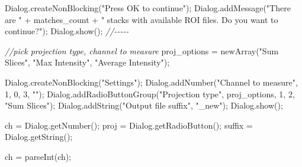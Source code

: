 \documentclass[
  12pt,
  a4paper,
]{book}
\newenvironment{Shaded}{}{}
\newcommand{\CommentTok}[1]{\textcolor[rgb]{0.38,0.63,0.69}{\textit{#1}}}
\newcommand{\DecValTok}[1]{\textcolor[rgb]{0.25,0.63,0.44}{#1}}
\newcommand{\NormalTok}[1]{#1}
\newcommand{\OperatorTok}[1]{\textcolor[rgb]{0.40,0.40,0.40}{#1}}
\newcommand{\StringTok}[1]{\textcolor[rgb]{0.25,0.44,0.63}{#1}}
\begin{document}
\begin{Shaded}
\begin{Highlighting}[]
\NormalTok{Dialog}\OperatorTok{.}\NormalTok{createNonBlocking}\OperatorTok{(}\StringTok{"Press OK to continue"}\OperatorTok{);}
\NormalTok{Dialog}\OperatorTok{.}\NormalTok{addMessage}\OperatorTok{(}\StringTok{"There are "} \OperatorTok{+}\NormalTok{ matches\_count }\OperatorTok{+} \StringTok{" stacks with available ROI files.  Do you want to continue?"}\OperatorTok{);}
\NormalTok{Dialog}\OperatorTok{.}\NormalTok{show}\OperatorTok{();}
\CommentTok{//{-}{-}{-}{-}{-}}

\CommentTok{//pick projection type, channel to measure}
\NormalTok{proj\_options }\OperatorTok{=}\NormalTok{ newArray}\OperatorTok{(}\StringTok{"Sum Slices"}\OperatorTok{,} \StringTok{"Max Intensity"}\OperatorTok{,} \StringTok{"Average Intensity"}\OperatorTok{);}

\NormalTok{Dialog}\OperatorTok{.}\NormalTok{createNonBlocking}\OperatorTok{(}\StringTok{"Settings"}\OperatorTok{);}
\NormalTok{Dialog}\OperatorTok{.}\NormalTok{addNumber}\OperatorTok{(}\StringTok{"Channel to measure"}\OperatorTok{,} \DecValTok{1}\OperatorTok{,} \DecValTok{0}\OperatorTok{,} \DecValTok{3}\OperatorTok{,} \StringTok{""}\OperatorTok{);}
\NormalTok{Dialog}\OperatorTok{.}\NormalTok{addRadioButtonGroup}\OperatorTok{(}\StringTok{"Projection type"}\OperatorTok{,}\NormalTok{ proj\_options}\OperatorTok{,} \DecValTok{1}\OperatorTok{,} \DecValTok{2}\OperatorTok{,} \StringTok{"Sum Slices"}\OperatorTok{);}
\NormalTok{Dialog}\OperatorTok{.}\NormalTok{addString}\OperatorTok{(}\StringTok{"Output file suffix"}\OperatorTok{,} \StringTok{"\_new"}\OperatorTok{);}
\NormalTok{Dialog}\OperatorTok{.}\NormalTok{show}\OperatorTok{();}

\NormalTok{ch }\OperatorTok{=}\NormalTok{ Dialog}\OperatorTok{.}\NormalTok{getNumber}\OperatorTok{();}
\NormalTok{proj }\OperatorTok{=}\NormalTok{ Dialog}\OperatorTok{.}\NormalTok{getRadioButton}\OperatorTok{();}
\NormalTok{suffix }\OperatorTok{=}\NormalTok{ Dialog}\OperatorTok{.}\NormalTok{getString}\OperatorTok{();}

\NormalTok{ch }\OperatorTok{=}\NormalTok{ parseInt}\OperatorTok{(}\NormalTok{ch}\OperatorTok{);}


\end{Highlighting}
\end{Shaded}
\end{document}
